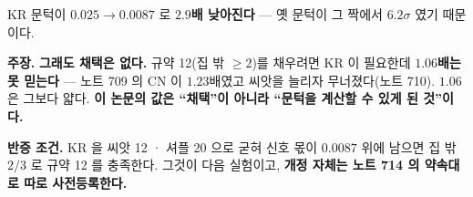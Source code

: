 \documentclass[10pt,a4paper]{article}
\newcommand{\claim}[2]{\begin{claimbox}\textbf{주장.} #1\par\smallskip
  \textcolor{gray!70}{\textbf{반증 조건.} #2}\end{claimbox}}
\begin{document}
KR 문턱이 $0.025 \to 0.0087$ 로 \textbf{$2.9$배 낮아진다} --- 옛 문턱이 그 짝에서
$6.2\sigma$ 였기 때문이다.

\claim{\textbf{그래도 채택은 없다.} 규약 12(집 밖 $\ge 2$)를 채우려면 KR 이 필요한데
\textbf{$1.06$배는 못 믿는다} --- 노트 709 의 CN 이 $1.23$배였고 씨앗을 늘리자
무너졌다(노트 710). $1.06$ 은 그보다 얇다. \textbf{이 논문의 값은 ``채택''이 아니라
``문턱을 계산할 수 있게 된 것''이다.}}
{KR 을 씨앗 12 · 셔플 20 으로 굳혀 신호 몫이 $0.0087$ 위에 남으면 집 밖 $2/3$ 로
규약 12 를 충족한다. 그것이 다음 실험이고, \textbf{개정 자체는 노트 714 의 약속대로
따로 사전등록한다.}}
\end{document}
